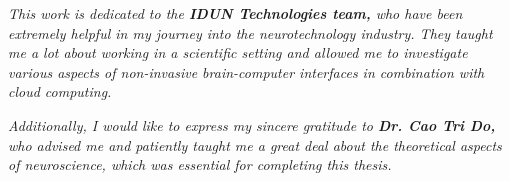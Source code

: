 \begin{dedication}

  \textit{This work is dedicated to the \textbf{IDUN Technologies team,} who have been extremely helpful in my journey into the neurotechnology industry. They taught me a lot about working in a scientific setting and allowed me to investigate various aspects of non-invasive brain-\break computer interfaces in combination with cloud computing.}

  \hfill \break

  \textit{Additionally, I would like to express my sincere gratitude to \textbf{Dr. Cao Tri Do,} who advised me and patiently taught me a great deal about the theoretical aspects of neuroscience, \break which was essential for completing this thesis.}

\end{dedication}
